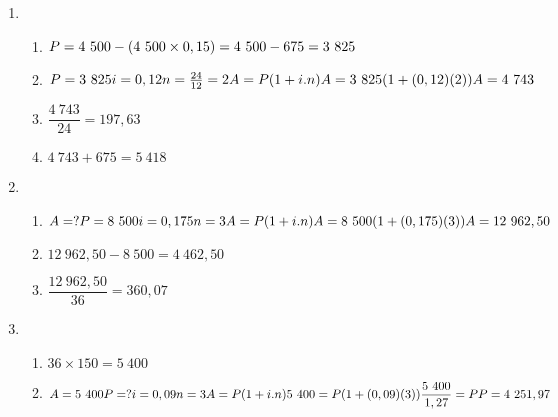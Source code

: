  \begin{solutions}{}{
\begin{enumerate}[itemsep=5pt, label=\textbf{\arabic*}. ] 


\item \begin{enumerate}[noitemsep, label=\textbf{(\alph*)} ]
  \item  $P=4~500 - (4~500 \times 0,15) \\
= 4~500 - 675 \\
= 3~825$
  \item $P = 3~825\\
i=0,12\\
n=\frac{24}{12}=2\\
A=P(1 + i.n)\\
A = 3~825(1 + (0,12)(2))\\
A=4~743$
  \item $\dfrac{4~743}{24} = 197,63$
  \item $4~743+675=5~418$
  \end{enumerate}
\item \begin{enumerate}[noitemsep, label=\textbf{(\alph*)} ]
  \item $A=?
P = 8~500\\
i=0,175\\
n=3\\
A=P(1 + i.n)\\
A = 8~500(1 + (0,175)(3))\\
A=12~962,50$
  \item $12~962,50-8~500=4~462,50$
  \item $\dfrac{12~962,50}{36}=360,07$
  \end{enumerate}
\item \begin{enumerate}[noitemsep, label=\textbf{(\alph*)} ]
  \item $36 \times 150 = 5~400$
  \item $A=5~400\\
P = ?\\
i=0,09\\
n=3\\
A=P(1 + i.n)\\
5~400 = P(1 + (0,09)(3))\\
\dfrac{5~400}{1,27} = P\\
P=4~251,97$
  \end{enumerate}

\end{enumerate}}
\end{solutions}


